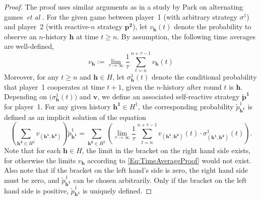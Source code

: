 \documentclass[9pt,twoside,lineno]{pnas-new}
\theoremstyle{plainCl1}
\theoremstyle{plainCl2}
\begin{document}
\begin{proof} 
The proof uses similar arguments as in a study by Park on alternating games~{\it et al} \citep{park:NComms:2022}. 
For the given game between player~1 (with arbitrary strategy $\sigma^1$) and player~2 (with reactive-$n$ strategy $\mathbf{p^2}$), let $v_\mathbf{h}(t)$ denote the probability to observe an $n$-history $\mathbf{h}$ at time $t\!\ge\!n$. 
By assumption, the following time averages are well-defined,
\begin{equation}\label{Eq:TimeAverageProof}
v_\mathbf{h}:=\lim_{\tau \to \infty} \frac{1}{\tau} \sum_{t=n}^{n+\tau-1} v_\mathbf{h}(t)
\end{equation}
Moreover, for any $t\!\ge\!n$ and $\mathbf{h}\!\in\! H$, let $\sigma^1_\mathbf{h}(t)$ denote the conditional probability that player~1 cooperates at time $t\!+\!1$, given the $n$-history after round $t$ is $\mathbf{h}$. Depending on $\big(\sigma^1_\mathbf{h}(t)\big)$ and $\mathbf{v}$, we define an associated self-reactive strategy $\mathbf{\tilde p^1}$ for player~1. For any given history $\mathbf{h^1} \!\in\! H^1$, the corresponding probability $\tilde p^1_\mathbf{h^1}$ is defined as an implicit solution of the equation
\begin{equation} \label{Eq:EquivalentSelfReactive}
\left( \sum_{\mathbf{h^2} \in H^2} v_{(\mathbf{h^1}, \mathbf{h^2})} \right) \tilde p^1_{\mathbf{h^1}}
=
 \sum_{\mathbf{h^2} \in H^2}
\left(\lim_{\tau \to \infty} \frac{1}{\tau} \sum_{t=n}^{n+\tau-1} v_{(\mathbf{h^1}, \mathbf{h^2})} (t)\cdot \sigma^1_{(\mathbf{h^1}, \mathbf{h^2})}(t)\right).
\end{equation}
Note that for each $\mathbf{h}\!\in\! H$, the limit in the bracket on the right hand side exists, for otherwise the limits $v_\mathbf{h}$ according to \eqref{Eq:TimeAverageProof} would not exist. Also note that if the bracket on the left hand's side is zero, the right hand side must be zero, and $\tilde p^1_\mathbf{h^1}$ can be chosen arbitrarily. Only if the bracket on the left hand side is positive, $\tilde p^1_\mathbf{h^1}$ is uniquely defined. 


\end{proof}
\end{document}
